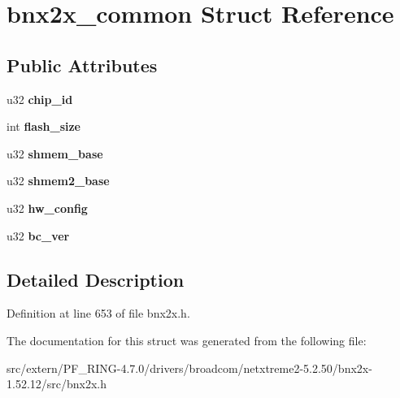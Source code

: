 \hypertarget{structbnx2x__common}{
\section{bnx2x\_\-common Struct Reference}
\label{structbnx2x__common}
}
\subsection*{Public Attributes}
\begin{DoxyCompactItemize}
\item 
\hypertarget{structbnx2x__common_a8c1d8f52a34c4d38bf931c11ace12116}{
u32 {\bfseries chip\_\-id}}
\label{structbnx2x__common_a8c1d8f52a34c4d38bf931c11ace12116}

\item 
\hypertarget{structbnx2x__common_a6735018f6e6d71290f6be8d445c3b0d3}{
int {\bfseries flash\_\-size}}
\label{structbnx2x__common_a6735018f6e6d71290f6be8d445c3b0d3}

\item 
\hypertarget{structbnx2x__common_a71bf881d93c31741348f2ffc7fba2015}{
u32 {\bfseries shmem\_\-base}}
\label{structbnx2x__common_a71bf881d93c31741348f2ffc7fba2015}

\item 
\hypertarget{structbnx2x__common_a167b77d02b5af60fbaecfafbea4e2b86}{
u32 {\bfseries shmem2\_\-base}}
\label{structbnx2x__common_a167b77d02b5af60fbaecfafbea4e2b86}

\item 
\hypertarget{structbnx2x__common_a3ec14944c90b38c2437ad87336c90d57}{
u32 {\bfseries hw\_\-config}}
\label{structbnx2x__common_a3ec14944c90b38c2437ad87336c90d57}

\item 
\hypertarget{structbnx2x__common_ad3580056d68be5617e4ddaeda10d91a9}{
u32 {\bfseries bc\_\-ver}}
\label{structbnx2x__common_ad3580056d68be5617e4ddaeda10d91a9}

\end{DoxyCompactItemize}


\subsection{Detailed Description}


Definition at line 653 of file bnx2x.h.



The documentation for this struct was generated from the following file:\begin{DoxyCompactItemize}
\item 
src/extern/PF\_\-RING-\/4.7.0/drivers/broadcom/netxtreme2-\/5.2.50/bnx2x-\/1.52.12/src/bnx2x.h\end{DoxyCompactItemize}
